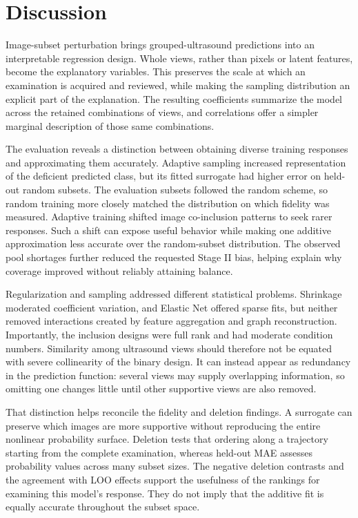 \section{Discussion}
Image-subset perturbation brings grouped-ultrasound predictions into an interpretable regression design. Whole views, rather than pixels or latent features, become the explanatory variables. This preserves the scale at which an examination is acquired and reviewed, while making the sampling distribution an explicit part of the explanation. The resulting coefficients summarize the model across the retained combinations of views, and correlations offer a simpler marginal description of those same combinations.

The evaluation reveals a distinction between obtaining diverse training responses and approximating them accurately. Adaptive sampling increased representation of the deficient predicted class, but its fitted surrogate had higher error on held-out random subsets. The evaluation subsets followed the random scheme, so random training more closely matched the distribution on which fidelity was measured. Adaptive training shifted image co-inclusion patterns to seek rarer responses. Such a shift can expose useful behavior while making one additive approximation less accurate over the random-subset distribution. The observed pool shortages further reduced the requested Stage II bias, helping explain why coverage improved without reliably attaining balance.

Regularization and sampling addressed different statistical problems. Shrinkage moderated coefficient variation, and Elastic Net offered sparse fits, but neither removed interactions created by feature aggregation and graph reconstruction. Importantly, the inclusion designs were full rank and had moderate condition numbers. Similarity among ultrasound views should therefore not be equated with severe collinearity of the binary design. It can instead appear as redundancy in the prediction function: several views may supply overlapping information, so omitting one changes little until other supportive views are also removed.

That distinction helps reconcile the fidelity and deletion findings. A surrogate can preserve which images are more supportive without reproducing the entire nonlinear probability surface. Deletion tests that ordering along a trajectory starting from the complete examination, whereas held-out MAE assesses probability values across many subset sizes. The negative deletion contrasts and the agreement with LOO effects support the usefulness of the rankings for examining this model's response. They do not imply that the additive fit is equally accurate throughout the subset space.

